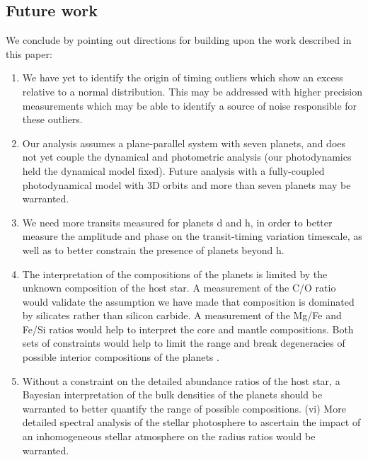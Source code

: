 \documentclass[fleqn,usenatbib]{mnras} %
\begin{document}


\subsection{Future work}

We conclude by pointing out directions for building upon the work described in this paper:
\begin{enumerate}
    \item We have yet to identify the origin of timing outliers which
    show an excess relative to a normal distribution.  This may be addressed
    with higher precision measurements which may be able to identify a source
    of noise responsible for these outliers.
    \item Our analysis assumes a plane-parallel system with seven planets, and
    does not yet couple the dynamical and photometric analysis (our photodynamics
    held the dynamical model fixed).  Future analysis with a fully-coupled
    photodynamical model with 3D orbits and more than seven planets may be warranted.
    \item We need more transits measured for planets d and h, in order
    to better measure the amplitude and phase on the transit-timing variation
    timescale, as well as to better constrain the presence of planets beyond h.
    \item The interpretation of the compositions of the planets is limited by the unknown composition of the host star. A measurement of the C/O ratio would validate the assumption we have made that composition is dominated by silicates rather than silicon carbide.  A measurement of the Mg/Fe and Fe/Si ratios would help to interpret the core and mantle compositions.  Both sets of constraints would help to limit the range and break degeneracies of possible interior compositions of the planets \citep{Dorn2015,Bitsch2019}.
    \item Without a constraint on the detailed abundance ratios of the host star, a Bayesian interpretation of the bulk densities of the planets should be warranted \citep{Dorn2016} to better quantify the range of possible compositions.
    (vi) More detailed spectral analysis of the stellar photosphere to ascertain the impact of an inhomogeneous stellar atmosphere on the radius ratios would be warranted. 
\end{enumerate}
\end{document}
